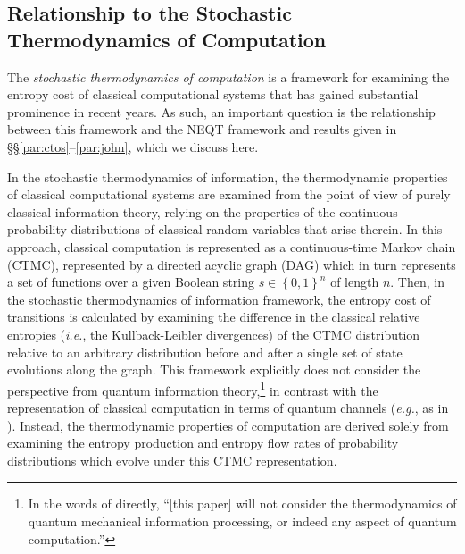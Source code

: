\documentclass[preprints,article,accept,moreauthors,pdftex]{Definitions/mdpi}
\begin{document}
\begin{paracol}{2}
\subsection{Relationship to the Stochastic Thermodynamics of Computation}
\label{ssec:wolpert}
The \emph{stochastic thermodynamics of computation} \cite{Wol19a, Wol19b} is a framework for examining the entropy cost of classical computational systems that has gained substantial prominence in recent years. As such, an important question is the relationship between this framework and the NEQT framework and results given in \S\S\ref{par:ctos}--\ref{par:john}, which we discuss here.

In the stochastic thermodynamics of information, the thermodynamic properties of classical computational systems are examined \cite{Wol19a} from the point of view of purely classical information theory, relying on the properties of the continuous probability distributions of classical random variables that arise therein. In this approach, classical computation is represented as a continuous-time Markov chain (CTMC), represented by a directed acyclic graph (DAG) which in turn represents a set of functions over a given Boolean string $s \in \left\{0,1\right\}^{n}$ of length $n$. Then, in the stochastic thermodynamics of information framework, the entropy cost of transitions is calculated by examining the difference in the classical relative entropies (\emph{i.e.}, the Kullback-Leibler divergences) of the CTMC distribution relative to an arbitrary distribution before and after a single set of state evolutions along the graph. This framework explicitly does not consider the perspective from quantum information theory,\footnote{In the words of \cite{Wol19a} directly, ``[this paper] will not consider the thermodynamics of quantum mechanical information processing, or indeed any aspect of quantum computation.''} in contrast with the representation of classical computation in terms of quantum channels (\emph{e.g.}, as in \cite{Lan61,Ben73,Ben82,BL85,Lan87,Ben88,NC00,NRS07,Wolf12,Attal14,Wilde17}). Instead, the thermodynamic properties of computation are derived solely from examining the entropy production and entropy flow rates of probability distributions which evolve under this CTMC representation.


\end{paracol}
\end{document}
